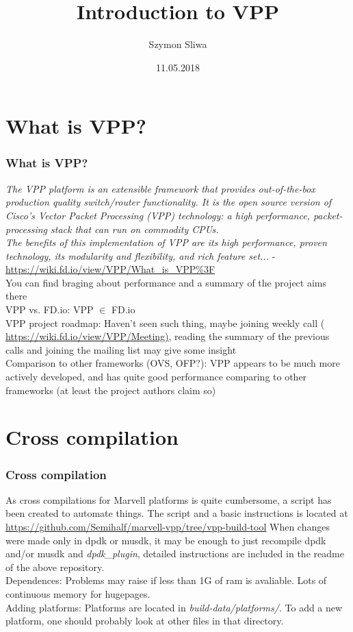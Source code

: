 \documentclass{beamer}
\title{Introduction to VPP}
\author{Szymon Sliwa}
\date{11.05.2018}
\begin{document}
\frame{\titlepage}

  \begin{frame}
  \tableofcontents
  \end{frame}

\section{What is VPP?}
  \begin{frame}
  \frametitle{What is VPP?}
  \textit{The VPP platform is an extensible framework that provides out-of-the-box production quality switch/router functionality. It is the open source version of Cisco's Vector Packet Processing (VPP) technology: a high performance, packet-processing stack that can run on commodity CPUs. \\
The benefits of this implementation of VPP are its high performance, proven technology, its modularity and flexibility, and rich feature set...} - \url{https://wiki.fd.io/view/VPP/What_is_VPP\%3F} \\
  \vfill
You can find braging about performance and a summary of the project aims there \\
  {\tiny \color{blue} VPP vs. FD.io:} {\tiny \color{red} VPP $\in$ FD.io} \\
  {\tiny \color{blue} VPP project roadmap:} {\tiny \color{red} Haven't seen such thing, maybe joining weekly call ({\color{purple} \url{https://wiki.fd.io/view/VPP/Meeting)}}, reading the summary of the previous calls and joining the mailing list may give some insight} \\
  {\tiny \color{blue} Comparison to other frameworks (OVS, OFP?):}
           {\tiny \color{red} VPP appears to be much more actively developed,
           and has quite good performance comparing to other frameworks (at least the project authors claim so)}

  \end{frame}

\section{Cross compilation}
  \begin{frame}
  \frametitle{Cross compilation}
  As cross compilations for Marvell platforms is quite cumbersome, a script has been 
  created to automate things. The script and a basic instructions is located at
  {\tiny\url{https://github.com/Semihalf/marvell-vpp/tree/vpp-build-tool}}
  \vfill
    When changes were made only in dpdk or musdk, it may be enough to just
  recompile dpdk and/or musdk and \textit{dpdk\_plugin}, detailed instructions are included in the readme
  of the above repository. \\
  {\tiny \color{blue} Dependences:} {\tiny \color{red} Problems may raise if less than 1G of ram is avaliable. Lots of continuous memory for hugepages.} \\
  {\tiny \color{blue} Adding platforms:} {\tiny \color{red} Platforms are located in \textit{build-data/platforms/}.
  To add a new platform, one should probably look at other files in that directory.} \\
  \end{frame}
\end{document}
